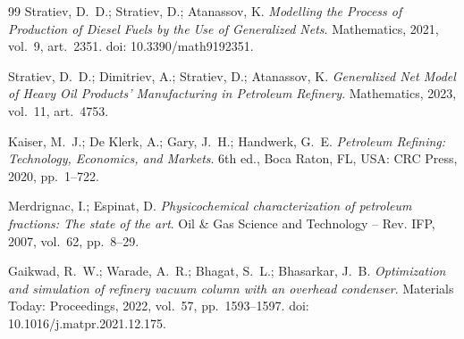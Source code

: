 \begin{thebibliography}{99}
Stratiev, D.~D.; Stratiev, D.; Atanassov, K.
\newblock \emph{Modelling the Process of Production of Diesel Fuels by the Use of Generalized Nets}.
\newblock Mathematics, 2021, vol.~9, art.~2351.
\newblock doi: 10.3390/math9192351.

Stratiev, D.~D.; Dimitriev, A.; Stratiev, D.; Atanassov, K.
\newblock \emph{Generalized Net Model of Heavy Oil Products' Manufacturing in Petroleum Refinery}.
\newblock Mathematics, 2023, vol.~11, art.~4753.

Kaiser, M.~J.; De Klerk, A.; Gary, J.~H.; Handwerk, G.~E.
\newblock \emph{Petroleum Refining: Technology, Economics, and Markets}.
\newblock 6th ed., Boca Raton, FL, USA: CRC Press, 2020, pp.~1--722.

Merdrignac, I.; Espinat, D.
\newblock \emph{Physicochemical characterization of petroleum fractions: The state of the art}.
\newblock Oil \& Gas Science and Technology -- Rev. IFP, 2007, vol.~62, pp.~8--29.

Gaikwad, R.~W.; Warade, A.~R.; Bhagat, S.~L.; Bhasarkar, J.~B.
\newblock \emph{Optimization and simulation of refinery vacuum column with an overhead condenser}.
\newblock Materials Today: Proceedings, 2022, vol.~57, pp.~1593--1597.
\newblock doi: 10.1016/j.matpr.2021.12.175.

\end{thebibliography}